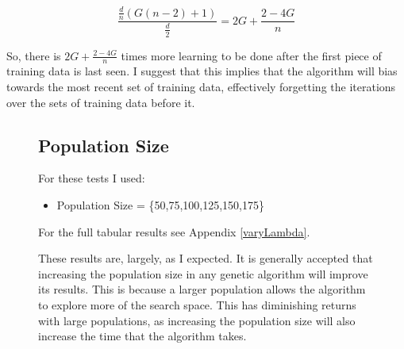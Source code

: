 \begin{equation}
    \frac{\frac{d}{n}(G(n - 2) + 1)}{\frac{d}{2}} = 2G + \frac{2-4G}{n}
\end{equation}

So, there is $2G + \frac{2-4G}{n}$ times more learning to be done after the first piece of training data is last seen. I suggest that this implies that the algorithm will bias towards the most recent set of training data, effectively forgetting the iterations over the sets of training data before it.

\clearpage

\begin{figure}[p]
    \setlength{\parindent}{24pt}
    \subsection{Population Size}
    For these tests I used:
    \begin{itemize}
        \item Population Size = \{50,75,100,125,150,175\}
    \end{itemize}
    
    \begin{center}
    \end{center}
    
    \noindent For the full tabular results see Appendix \ref{varyLambda}.
    \vspace{4mm}

    {\centering
    }
    \newline
    
    These results are, largely, as I expected. It is generally accepted that increasing the population size in any genetic algorithm will improve its results. This is because a larger population allows the algorithm to explore more of the search space. This has diminishing returns with large populations, as increasing the population size will also increase the time that the algorithm takes. \newline
    

\end{figure}
